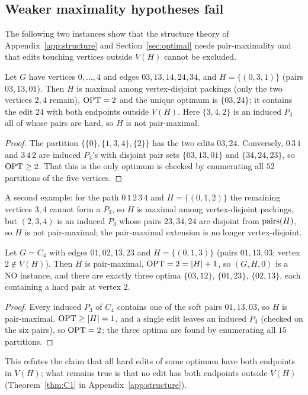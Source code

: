 \subsection{Weaker maximality hypotheses fail}
The following two instances show that the structure theory of Appendix~\ref{app:structure} and Section~\ref{sec:optimal} needs pair-maximality and that edits touching vertices outside $V(H)$ cannot be excluded.
\begin{proposition}\label{prop:vertexmax}
Let $G$ have vertices $0,\dots,4$ and edges $03,13,14,24,34$, and $H=\{(0,3,1)\}$ (pairs $03,13,01$). Then $H$ is maximal among vertex-disjoint packings (only the two vertices $2,4$ remain), $\mathrm{OPT}=2$ and the unique optimum is $\{03,24\}$; it contains the edit $24$ with both endpoints outside $V(H)$. Here $\{3,4,2\}$ is an induced $P_3$ all of whose pairs are hard, so $H$ is not pair-maximal.
\end{proposition}
\begin{proof}
The partition $\{\{0\},\{1,3,4\},\{2\}\}$ has the two edits $03,24$. Conversely, $0\,3\,1$ and $3\,4\,2$ are induced $P_3$'s with disjoint pair sets $\{03,13,01\}$ and $\{34,24,23\}$, so $\mathrm{OPT}\ge2$. That this is the only optimum is checked by enumerating all $52$ partitions of the five vertices.
\end{proof}
A second example: for the path $0\,1\,2\,3\,4$ and $H=\{(0,1,2)\}$ the remaining vertices $3,4$ cannot form a $P_3$, so $H$ is maximal among vertex-disjoint packings, but $(2,3,4)$ is an induced $P_3$ whose pairs $23,34,24$ are disjoint from $\mathrm{pairs}(H)$, so $H$ is not pair-maximal; the pair-maximal extension is no longer vertex-disjoint.
\begin{proposition}\label{prop:c4}
Let $G=C_4$ with edges $01,02,13,23$ and $H=\{(0,1,3)\}$ (pairs $01,13,03$; vertex $2\notin V(H)$). Then $H$ is pair-maximal, $\mathrm{OPT}=2=|H|+1$, so $(G,H,0)$ is a NO instance, and there are exactly three optima $\{03,12\}$, $\{01,23\}$, $\{02,13\}$, each containing a hard pair at vertex $2$.
\end{proposition}
\begin{proof}
Every induced $P_3$ of $C_4$ contains one of the soft pairs $01,13,03$, so $H$ is pair-maximal. $\mathrm{OPT}\ge|H|=1$, and a single edit leaves an induced $P_3$ (checked on the six pairs), so $\mathrm{OPT}=2$; the three optima are found by enumerating all $15$ partitions.
\end{proof}
This refutes the claim that all hard edits of some optimum have both endpoints in $V(H)$; what remains true is that no edit has both endpoints outside $V(H)$ (Theorem~\ref{thm:C1} in Appendix~\ref{app:structure}).
